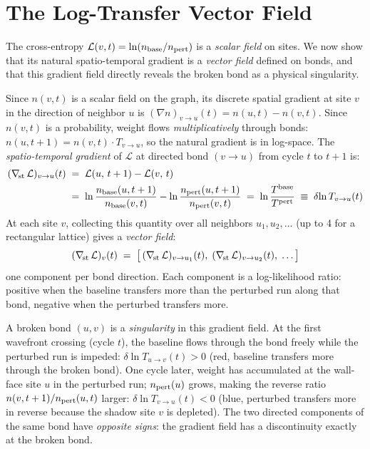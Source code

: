 \documentclass[11pt]{article}
\begin{document}
\section{The Log-Transfer Vector Field}
\label{sec:logtransfer}

The cross-entropy $\mathcal{L}(v,t) = \ln(n_{\rm base}/n_{\rm pert})$ is a
\emph{scalar field} on sites. We now show that its natural spatio-temporal
gradient is a \emph{vector field} defined on bonds, and that this gradient
field directly reveals the broken bond as a physical singularity.

Since $n(v,t)$ is a scalar field on the graph, its discrete spatial gradient
at site $v$ in the direction of neighbor $u$ is $(\nabla n)_{v\to u}(t) =
n(u,t) - n(v,t)$. Since $n(v,t)$ is a probability, weight flows \emph{multiplicatively}
through bonds: $n(u,t+1) = n(v,t)\cdot T_{v\to u}$, so the natural
gradient is in log-space. The \emph{spatio-temporal gradient} of
$\mathcal{L}$ at directed bond $(v \to u)$ from cycle $t$ to $t+1$ is:
\begin{align}
    (\nabla_{\!\rm st}\,\mathcal{L})_{v \to u}(t)
    &\;=\; \mathcal{L}(u,\,t+1) - \mathcal{L}(v,\,t) \nonumber\\
    &\;=\; \ln\frac{n_{\rm base}(u,t+1)}{n_{\rm base}(v,t)}
         -\ln\frac{n_{\rm pert}(u,t+1)}{n_{\rm pert}(v,t)}
    \;=\; \ln\frac{T^{\rm base}}{T^{\rm pert}}
    \;\equiv\; \delta\!\ln T_{v \to u}(t)
    \label{eq:dlogT}
\end{align}
At each site $v$, collecting this quantity over all neighbors
$u_1, u_2, \ldots$ (up to 4 for a rectangular lattice) gives a
\emph{vector field}:
\begin{equation}
    (\nabla_{\!\rm st}\,\mathcal{L})_v(t)
    \;=\; \bigl[\,(\nabla_{\!\rm st}\,\mathcal{L})_{v \to u_1}(t),\;
                  (\nabla_{\!\rm st}\,\mathcal{L})_{v \to u_2}(t),\;
                  \ldots\,\bigr]
    \label{eq:gradvec}
\end{equation}
one component per bond direction. Each component is a log-likelihood
ratio: positive when the baseline transfers more than the perturbed run
along that bond, negative when the perturbed transfers more.

A broken bond $(u,v)$ is a \emph{singularity} in this gradient field.
At the first wavefront crossing (cycle $t$), the baseline flows through
the bond freely while the perturbed run is impeded:
$\delta\!\ln T_{u \to v}(t) > 0$ (red, baseline transfers more through
the broken bond). One cycle later, weight has accumulated at the wall-face
site $u$ in the perturbed run; $n_{\rm pert}(u)$ grows, making the
reverse ratio $n(v,t+1)/n_{\rm pert}(u,t)$ larger:
$\delta\!\ln T_{v \to u}(t) < 0$ (blue, perturbed transfers more in
reverse because the shadow site $v$ is depleted). The two directed
components of the same bond have \emph{opposite signs}: the gradient
field has a discontinuity exactly at the broken bond.
\end{document}

